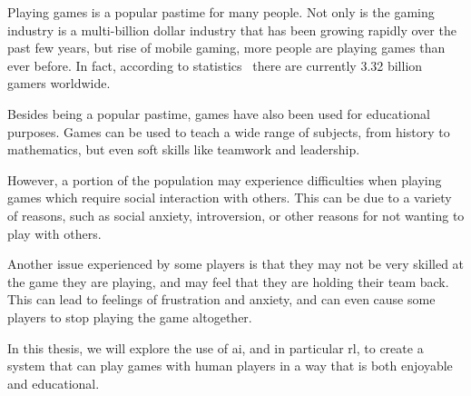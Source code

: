 Playing games is a popular pastime for many people. Not only is the gaming
industry is a multi-billion dollar industry that has been growing rapidly over
the past few years, but rise of mobile gaming, more people are playing games
than ever before. In fact, according to statistics~\cite{gamer-count} there are
currently 3.32 billion gamers worldwide.

Besides being a popular pastime, games have also been used for educational
purposes. Games can be used to teach a wide range of subjects, from history to
mathematics, but even soft skills like teamwork and leadership.

However, a portion of the population may experience difficulties when playing
games which require social interaction with others. This can be due to a
variety of reasons, such as social anxiety, introversion, or other reasons for
not wanting to play with others.

Another issue experienced by some players is that they may not be very skilled
at the game they are playing, and may feel that they are holding their team
back. This can lead to feelings of frustration and anxiety, and can even cause
some players to stop playing the game altogether.

In this thesis, we will explore the use of \gls{ai}, and in particular
\gls{rl}, to create a system that can play games with human players in a way
that is both enjoyable and educational.